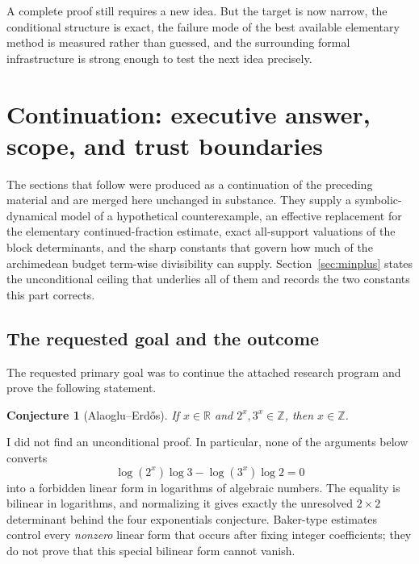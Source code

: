 \documentclass[11pt,oneside]{article}
\newtheorem{conjecture}[theorem]{Conjecture}
\theoremstyle{definition}
\theoremstyle{remark}
\newcommand{\Z}{\mathbb Z}
\newcommand{\R}{\mathbb R}
\begin{document}
A complete proof still requires a new idea.  But the target is now narrow, the conditional
structure is exact, the failure mode of the best available elementary method is measured
rather than guessed, and the surrounding formal infrastructure is strong enough to test the
next idea precisely.
\clearpage

\section{Continuation: executive answer, scope, and trust boundaries}
\label{sec:continuation}

The sections that follow were produced as a continuation of the preceding material and
are merged here unchanged in substance.  They supply a symbolic-dynamical model of a
hypothetical counterexample, an effective replacement for the elementary
continued-fraction estimate, exact all-support valuations of the block determinants, and
the sharp constants that govern how much of the archimedean budget term-wise divisibility
can supply.  Section~\ref{sec:minplus} states the unconditional ceiling that
underlies all of them and records the two constants this part corrects.


\subsection{The requested goal and the outcome}

The requested primary goal was to continue the attached research program and prove the
following statement.

\begin{conjecture}[Alaoglu--Erd\H{o}s]
If $x\in\R$ and $2^x,3^x\in\Z$, then $x\in\Z$.
\end{conjecture}

I did not find an unconditional proof.  In particular, none of the arguments below converts
\[
  \log(2^x)\log3-\log(3^x)\log2=0
\]
into a forbidden linear form in logarithms of algebraic numbers.  The equality is bilinear in
logarithms, and normalizing it gives exactly the unresolved $2\times2$ determinant behind the
four exponentials conjecture.  Baker-type estimates control every \emph{nonzero} linear form
that occurs after fixing integer coefficients; they do not prove that this special bilinear
form cannot vanish.
\end{document}
